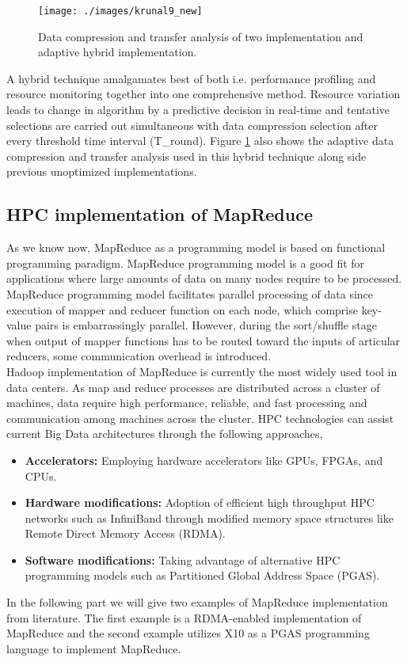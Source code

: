 \documentclass[runningheads,a4paper]{llncs}
\begin{document}
{\begin{figure}[!htb]
	\texttt{[image: ./images/krunal9\_new]}
	\centering
	\caption{Data compression and transfer analysis of two implementation and adaptive hybrid implementation.}
	\label{fig:krunal9}
\end{figure}

A hybrid technique amalgamates best of both i.e. performance profiling and resource monitoring together into one comprehensive method. Resource variation leads to change in algorithm by a predictive decision in real-time and tentative selections are carried out simultaneous with data compression selection after every threshold time interval (T\_round). Figure \ref{fig:krunal9} also shows the adaptive data compression and transfer analysis used in this hybrid technique along side previous unoptimized implementations.\\

\newpage
\subsection{HPC implementation of MapReduce}
As we know now, MapReduce as a programming model is based on functional programming paradigm. MapReduce programming model is a good fit for applications where large amounts of data on many nodes require to be processed. MapReduce programming model facilitates parallel processing of data since execution of mapper and reducer function on each node, which comprise key-value pairs is embarrassingly parallel. However, during the sort/shuffle stage when output of mapper functions has to be routed toward the inputs of articular reducers, some communication overhead is introduced.\\

Hadoop implementation of MapReduce is currently the most widely used tool in data centers. As map and reduce processes are distributed across a cluster of machines, data require high performance, reliable, and fast processing and communication among machines across the cluster. HPC technologies can assist current Big Data architectures through the following approaches,
\begin{itemize}
	\item \textbf{Accelerators:} Employing hardware accelerators like GPUs, FPGAs, and CPUs.\\
	\item \textbf{Hardware modifications:} Adoption of efficient high throughput HPC networks such as InfiniBand through modified memory space structures like Remote Direct Memory Access (RDMA).\\
	\item \textbf{Software modifications:} Taking advantage of alternative HPC programming models such as Partitioned Global Address Space (PGAS).\\
\end{itemize}
In the following part we will give two examples of MapReduce implementation from literature. The first example is a RDMA-enabled implementation of MapReduce and the second example utilizes X10 as a PGAS programming language to implement MapReduce.\\


}
\end{document}
